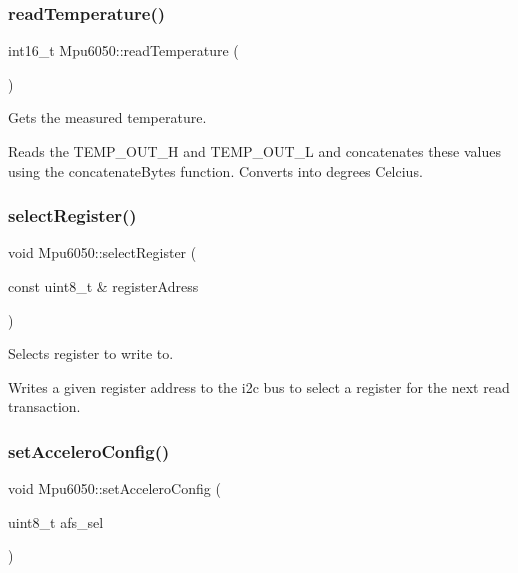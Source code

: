 \subsubsection{\texorpdfstring{read\+Temperature()}{readTemperature()}}
{\footnotesize\ttfamily int16\+\_\+t Mpu6050\+::read\+Temperature (\begin{DoxyParamCaption}{ }\end{DoxyParamCaption})\hspace{0.3cm}{\ttfamily [virtual]}}



Gets the measured temperature. 

Reads the T\+E\+M\+P\+\_\+\+O\+U\+T\+\_\+H and T\+E\+M\+P\+\_\+\+O\+U\+T\+\_\+L and concatenates these values using the concatenate\+Bytes function. Converts into degrees Celcius. \mbox{\label{classMpu6050_a2ea5f53f3c5afec1c2a0fe55bf028599}} 
\subsubsection{\texorpdfstring{select\+Register()}{selectRegister()}}
{\footnotesize\ttfamily void Mpu6050\+::select\+Register (\begin{DoxyParamCaption}\item[{const uint8\+\_\+t \&}]{register\+Adress }\end{DoxyParamCaption})\hspace{0.3cm}{\ttfamily [virtual]}}



Selects register to write to. 

Writes a given register address to the i2c bus to select a register for the next read transaction. \mbox{\label{classMpu6050_a3cfca1ea37e1d1bc4aebba7ceedb5a28}} 
\subsubsection{\texorpdfstring{set\+Accelero\+Config()}{setAcceleroConfig()}}
{\footnotesize\ttfamily void Mpu6050\+::set\+Accelero\+Config (\begin{DoxyParamCaption}\item[{uint8\+\_\+t}]{afs\+\_\+sel }\end{DoxyParamCaption})\hspace{0.3cm}{\ttfamily [virtual]}}



